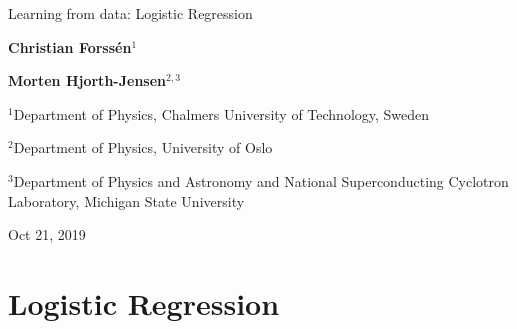 \documentclass[%
oneside,                 %
final,                   %
10pt]{article}
\begin{document}

\newcommand{\exercisesection}[1]{\subsection*{#1}}







\thispagestyle{empty}

\begin{center}
{\LARGE\bf
\begin{spacing}{1.25}
Learning from data: Logistic Regression
\end{spacing}
}
\end{center}


\begin{center}
{\bf Christian Forssén${}^{1}$} \\ [0mm]
\end{center}


\begin{center}
{\bf Morten Hjorth-Jensen${}^{2, 3}$} \\ [0mm]
\end{center}

\begin{center}
\centerline{{\small ${}^1$Department of Physics, Chalmers University of Technology, Sweden}}
\centerline{{\small ${}^2$Department of Physics, University of Oslo}}
\centerline{{\small ${}^3$Department of Physics and Astronomy and National Superconducting Cyclotron Laboratory, Michigan State University}}
\end{center}
    

\begin{center}
Oct 21, 2019
\end{center}

\vspace{1cm}


\section{Logistic Regression}
\end{document}
